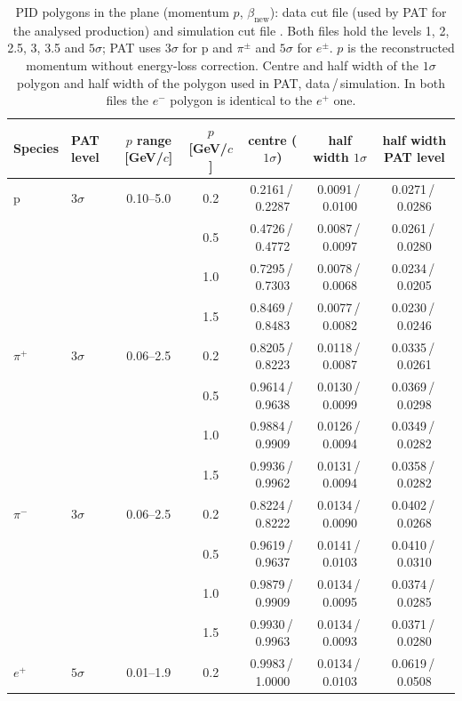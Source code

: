 \begin{table}[H]
\centering
\caption{PID polygons in the plane (momentum $p$, $\beta_{\mathrm{new}}$): data cut file  (used by PAT for the analysed production) and simulation cut file . Both files hold the levels 1, 2, 2.5, 3, 3.5 and $5\sigma$; PAT uses $3\sigma$ for p and $\pi^\pm$ and $5\sigma$ for $e^\pm$. $p$ is the reconstructed momentum without energy-loss correction. Centre and half width of the $1\sigma$ polygon and half width of the polygon used in PAT, data\,/\,simulation. In both files the $e^-$ polygon is identical to the $e^+$ one.}
\label{tab:pid_polygons}
\footnotesize
\setlength{\tabcolsep}{4pt}
\begin{tabular}{@{}l l c c c c c@{}}
\toprule
Species & PAT level & $p$ range [GeV/$c$] & $p$ [GeV/$c$] & centre ($1\sigma$) & half width $1\sigma$ & half width PAT level \\
\midrule
p & $3\sigma$ & 0.10--5.0 & 0.2 & 0.2161\,/\,0.2287 & 0.0091\,/\,0.0100 & 0.0271\,/\,0.0286 \\
 &  &  & 0.5 & 0.4726\,/\,0.4772 & 0.0087\,/\,0.0097 & 0.0261\,/\,0.0280 \\
 &  &  & 1.0 & 0.7295\,/\,0.7303 & 0.0078\,/\,0.0068 & 0.0234\,/\,0.0205 \\
 &  &  & 1.5 & 0.8469\,/\,0.8483 & 0.0077\,/\,0.0082 & 0.0230\,/\,0.0246 \\
\midrule
$\pi^+$ & $3\sigma$ & 0.06--2.5 & 0.2 & 0.8205\,/\,0.8223 & 0.0118\,/\,0.0087 & 0.0335\,/\,0.0261 \\
 &  &  & 0.5 & 0.9614\,/\,0.9638 & 0.0130\,/\,0.0099 & 0.0369\,/\,0.0298 \\
 &  &  & 1.0 & 0.9884\,/\,0.9909 & 0.0126\,/\,0.0094 & 0.0349\,/\,0.0282 \\
 &  &  & 1.5 & 0.9936\,/\,0.9962 & 0.0131\,/\,0.0094 & 0.0358\,/\,0.0282 \\
\midrule
$\pi^-$ & $3\sigma$ & 0.06--2.5 & 0.2 & 0.8224\,/\,0.8222 & 0.0134\,/\,0.0090 & 0.0402\,/\,0.0268 \\
 &  &  & 0.5 & 0.9619\,/\,0.9637 & 0.0141\,/\,0.0103 & 0.0410\,/\,0.0310 \\
 &  &  & 1.0 & 0.9879\,/\,0.9909 & 0.0134\,/\,0.0095 & 0.0374\,/\,0.0285 \\
 &  &  & 1.5 & 0.9930\,/\,0.9963 & 0.0134\,/\,0.0093 & 0.0371\,/\,0.0280 \\
\midrule
$e^+$ & $5\sigma$ & 0.01--1.9 & 0.2 & 0.9983\,/\,1.0000 & 0.0134\,/\,0.0103 & 0.0619\,/\,0.0508 \\

\end{tabular}
\end{table}
